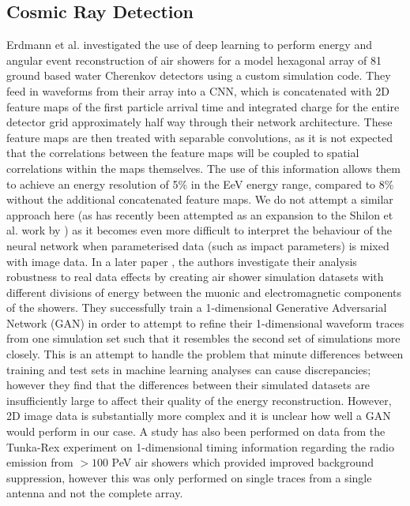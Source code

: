 \subsection{Cosmic Ray Detection}
Erdmann et al. \cite{aug1} investigated the use of deep learning to perform energy and angular event reconstruction of air showers for a model hexagonal array of 81 ground based water Cherenkov detectors using a custom simulation code. They feed in waveforms from their array into a CNN, which is concatenated with 2D feature maps of the first particle arrival time and integrated charge for the entire detector grid approximately half way through their network architecture. These feature maps are then treated with separable convolutions, as it is not expected that the correlations between the feature maps will be coupled to spatial correlations within the maps themselves. The use of this information allows them to achieve an energy resolution of 5\% in the EeV energy range, compared to 8\% without the additional concatenated feature maps. We do not attempt a similar approach here (as has recently been attempted as an expansion to the Shilon et al. work by \cite{ParsonsOhm}) as it becomes even more difficult to interpret the behaviour of the neural network when parameterised data (such as impact parameters) is mixed with image data. In a later paper \cite{ErdmannAuger}, the authors investigate their analysis robustness to real data effects by creating air shower simulation datasets with different divisions of energy between the muonic and electromagnetic components of the showers. They successfully train a 1-dimensional Generative Adversarial Network (GAN) in order to attempt to refine their 1-dimensional waveform traces from one simulation set such that it resembles the second set of simulations more closely. This is an attempt to handle the problem that minute differences between training and test sets in machine learning analyses can cause discrepancies; however they find that the differences between their simulated datasets are insufficiently large to affect their quality of the energy reconstruction. However, 2D image data is substantially more complex and it is unclear how well a GAN would perform in our case. A study has also been performed on data from the Tunka-Rex experiment \cite{tunka} on 1-dimensional timing information regarding the radio emission from $>100$ PeV air showers which provided improved background suppression, however this was only performed on single traces from a single antenna and not the complete array.
